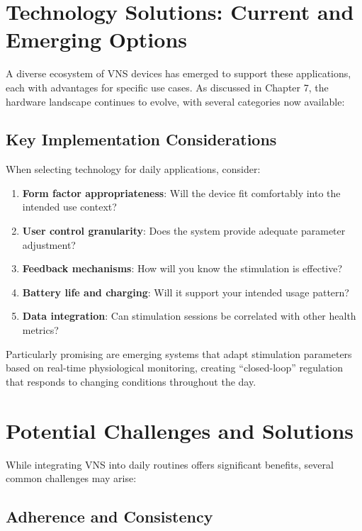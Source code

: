 \documentclass[
  Letterpaper,
]{scrbook}
\providecommand{\tightlist}{%
  \setlength{\itemsep}{0pt}\setlength{\parskip}{0pt}}\usepackage{longtable,booktabs,array}
\begin{document}
\section{Technology Solutions: Current and Emerging
Options}\label{technology-solutions-current-and-emerging-options}

A diverse ecosystem of VNS devices has emerged to support these
applications, each with advantages for specific use cases. As discussed
in Chapter 7, the hardware landscape continues to evolve, with several
categories now available:

\subsection{Key Implementation
Considerations}\label{key-implementation-considerations}

When selecting technology for daily applications, consider:

\begin{enumerate}
\def\labelenumi{\arabic{enumi}.}
\tightlist
\item
  \textbf{Form factor appropriateness}: Will the device fit comfortably
  into the intended use context?
\item
  \textbf{User control granularity}: Does the system provide adequate
  parameter adjustment?
\item
  \textbf{Feedback mechanisms}: How will you know the stimulation is
  effective?
\item
  \textbf{Battery life and charging}: Will it support your intended
  usage pattern?
\item
  \textbf{Data integration}: Can stimulation sessions be correlated with
  other health metrics?
\end{enumerate}

Particularly promising are emerging systems that adapt stimulation
parameters based on real-time physiological monitoring, creating
``closed-loop'' regulation that responds to changing conditions
throughout the day.

\section{Potential Challenges and
Solutions}\label{potential-challenges-and-solutions}

While integrating VNS into daily routines offers significant benefits,
several common challenges may arise:

\subsection{Adherence and Consistency}\label{adherence-and-consistency}
\end{document}
